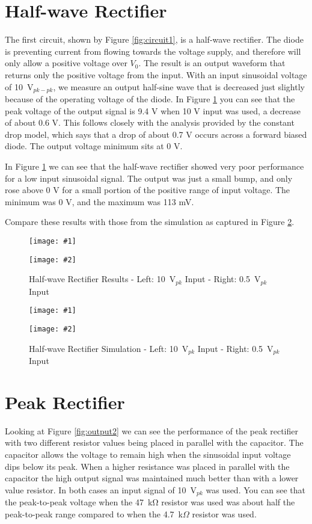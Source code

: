 \documentclass{article}
\newcommand{\twopics}[4]{
\begin{figure}[h!]
\begin{center}
  \begin{minipage}{.45\textwidth}
    \texttt{[image: \#1]}
  \end{minipage}
  \begin{minipage}{.45\textwidth}
    \texttt{[image: \#2]}
  \end{minipage}
  \caption{#4}
  \label{#3}
\end{center}
\end{figure}
}
\begin{document}
\section{Half-wave Rectifier} The first circuit, shown
by Figure \ref{fig:circuit1}, is a half-wave rectifier.
The diode is preventing current from flowing towards
the voltage supply, and therefore will only allow a
positive voltage over $V_0$. The result is an output
waveform that returns only the positive voltage from
the input. With an input sinusoidal voltage of 10~V$_{pk-pk}$,
we measure an output half-sine wave that is decreased
just slightly because of the operating voltage of the
diode. In Figure \ref{fig:output1} you can see that
the peak voltage of the output signal is 9.4 V when
10 V input was used, a decrease of about 0.6 V. This
follows closely with the analysis provided by the constant
drop model, which says that a drop of about 0.7 V occurs
across a forward biased diode. The output voltage minimum
sits at 0 V.

In Figure \ref{fig:output1} we can see that the half-wave
rectifier showed very poor performance for a low input
sinusoidal signal. The output was just a small bump, and
only rose above 0 V for a small portion of the positive
range of input voltage. The minimum was 0 V, and the maximum
was 113 mV.

Compare these results with those from the simulation
as captured in Figure \ref{fig:sim1}.

\twopics{scope/Circuit1-10V-max2}{scope/Circuit1-0.5V-max2}{fig:output1}
{Half-wave Rectifier Results - Left: 10~V$_{pk}$ Input - Right: 0.5~V$_{pk}$ Input}

\twopics{multisim/circuit1-10V}{multisim/circuit1-10V}{fig:sim1}
{Half-wave Rectifier Simulation - Left: 10~V$_{pk}$ Input - Right: 0.5~V$_{pk}$ Input}

\section{Peak Rectifier}

Looking at Figure \ref{fig:output2} we can see the
performance of the peak rectifier with two different
resistor values being placed in parallel with the capacitor.
The capacitor allows the voltage to remain high when
the sinusoidal input voltage dips below its peak. When
a higher resistance was placed in parallel with the
capacitor the high output signal was maintained much
better than with a lower value resistor. In both cases
an input signal of 10~V$_{pk}$ was used. You can see
that the peak-to-peak voltage when the 47~\si{\kohm}
resistor was used was about half the peak-to-peak range
compared to when the 4.7~k$\Omega$ resistor was used.
\end{document}

